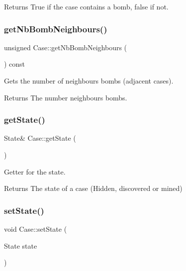 \begin{DoxyReturn}{Returns}
True if the case contains a bomb, false if not. 
\end{DoxyReturn}
\mbox{\label{class_case_ae6f3c6f3b725214d0c7db8661f7a7816}} 
\subsubsection{\texorpdfstring{get\+Nb\+Bomb\+Neighbours()}{getNbBombNeighbours()}}
{\footnotesize\ttfamily unsigned Case\+::get\+Nb\+Bomb\+Neighbours (\begin{DoxyParamCaption}{ }\end{DoxyParamCaption}) const\hspace{0.3cm}{\ttfamily [inline]}}



Gets the number of neighbours bombs (adjacent cases). 

\begin{DoxyReturn}{Returns}
The number neighbours bombs. 
\end{DoxyReturn}
\mbox{\label{class_case_a2b5ed0f60c9827735d9b782f50fe7d04}} 
\subsubsection{\texorpdfstring{get\+State()}{getState()}}
{\footnotesize\ttfamily State\& Case\+::get\+State (\begin{DoxyParamCaption}{ }\end{DoxyParamCaption})\hspace{0.3cm}{\ttfamily [inline]}}



Getter for the state. 

\begin{DoxyReturn}{Returns}
The state of a case (Hidden, discovered or mined) 
\end{DoxyReturn}
\mbox{\label{class_case_a4c6f440f1cf6c24cc33be445cc5aad45}} 
\subsubsection{\texorpdfstring{set\+State()}{setState()}}
{\footnotesize\ttfamily void Case\+::set\+State (\begin{DoxyParamCaption}\item[{State}]{state }\end{DoxyParamCaption})\hspace{0.3cm}{\ttfamily [inline]}}




